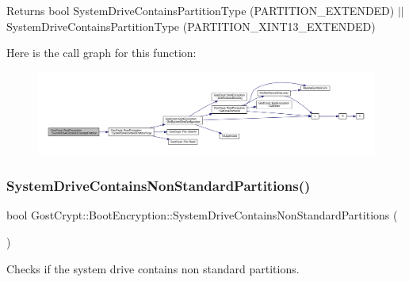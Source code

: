 \begin{DoxyReturn}{Returns}
bool System\+Drive\+Contains\+Partition\+Type (P\+A\+R\+T\+I\+T\+I\+O\+N\+\_\+\+E\+X\+T\+E\+N\+D\+ED) $\vert$$\vert$ System\+Drive\+Contains\+Partition\+Type (P\+A\+R\+T\+I\+T\+I\+O\+N\+\_\+\+X\+I\+N\+T13\+\_\+\+E\+X\+T\+E\+N\+D\+ED) 
\end{DoxyReturn}
Here is the call graph for this function\+:
\nopagebreak
\begin{figure}[H]
\begin{center}
\leavevmode
\includegraphics[width=350pt]{class_gost_crypt_1_1_boot_encryption_aa761ac20523a11bf2b2915d4eb53af70_cgraph}
\end{center}
\end{figure}
\mbox{\label{class_gost_crypt_1_1_boot_encryption_a097627633d56bf5421d836d036f6a0e7}} 
\subsubsection{\texorpdfstring{System\+Drive\+Contains\+Non\+Standard\+Partitions()}{SystemDriveContainsNonStandardPartitions()}}
{\footnotesize\ttfamily bool Gost\+Crypt\+::\+Boot\+Encryption\+::\+System\+Drive\+Contains\+Non\+Standard\+Partitions (\begin{DoxyParamCaption}{ }\end{DoxyParamCaption})}



Checks if the system drive contains non standard partitions. 


